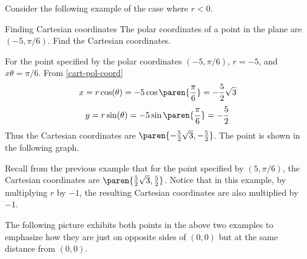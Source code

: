 Consider the following example of the case where $r < 0$. 

\begin{example}{Finding Cartesian coordinates}{}
The polar coordinates of a point in the plane are $(-5,\pi /6)$.
Find the Cartesian coordinates.
\end{example}

\begin{solution}
For the point specified by the polar coordinates $(-5, \pi /6)$,
$r=-5$, and $x\theta = \pi /6$. 
From {\eqref{cart-pol-coord}}
\[
x= r \cos (\theta)= -5\cos \paren{\vspace{0.05in}\frac{\pi }{6}} = -\vspace{0.05in}\frac{5}{2}\sqrt{3}
\]
\[
y= r \sin (\theta) = -5\sin \paren{\vspace{0.05in}\frac{\pi }{6}} = -\vspace{0.05in}\frac{5}{2}
\]
Thus the Cartesian coordinates are $\paren{-\vspace{0.05in}\frac{5}{2}\sqrt{3}, -\vspace{0.05in}\frac{5}{2}}$. The point is shown in the following graph.

\begin{center}
\end{center}

Recall from the previous example that for the point specified by $(5, \pi /6)$, the Cartesian coordinates are $\paren{\vspace{0.05in}\frac{5}{2}\sqrt{3}, \vspace{0.05in}\frac{5}{2}}$. Notice that in this example, by multiplying $r$ by $-1$, the resulting Cartesian coordinates are also multiplied by $-1$. 
\end{solution}

The following picture exhibits both points in the above two examples to
emphasize how they are just on opposite sides of $(0,0) $ but at
the same distance from $(0,0)$.

\begin{center}
\end{center}

